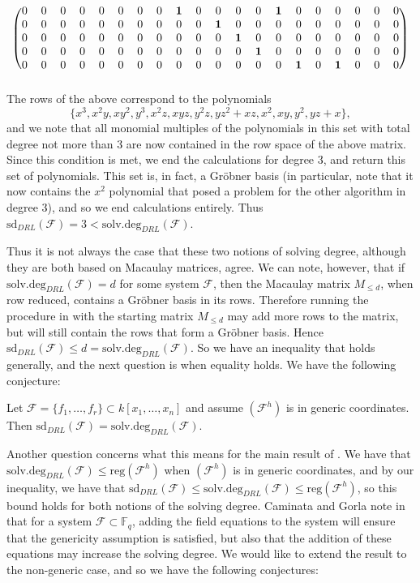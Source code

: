 \documentclass[11pt]{article}
\newenvironment{conjecture}[2][Conjecture]{\begin{trivlist}
\item[\hskip \labelsep {\bfseries #1}\hskip \labelsep {\bfseries #2.}]}{\end{trivlist}}
\newcommand{\F}{\mathcal{F}}
\newcommand{\sdeg}{\text{solv.deg}}
\newcommand{\sd}{\text{sd}}
\newcommand{\reg}{\text{reg}}
\begin{document}
\[\begin{blockarray}{cccccccccccccccccccc}
\begin{block}{(cccccccccccccccccccc)}
		0 & 0 & 0 & 0 & 0 & 0 & 0 & 0 & \mathbf{1} & 0 & 0 & 0 & 0 & \mathbf{1} & 0 & 0 & 0 & 0 & 0 & 0 \\
		0 & 0 & 0 & 0 & 0 & 0 & 0 & 0 & 0 & 0 & \mathbf{1} & 0 & 0 & 0 & 0 & 0 & 0 & 0 & 0 & 0 \\
		0 & 0 & 0 & 0 & 0 & 0 & 0 & 0 & 0 & 0 & 0 & \mathbf{1} & 0 & 0 & 0 & 0 & 0 & 0 & 0 & 0 \\
		0 & 0 & 0 & 0 & 0 & 0 & 0 & 0 & 0 & 0 & 0 & 0 & \mathbf{1} & 0 & 0 & 0 & 0 & 0 & 0 & 0 \\
		0 & 0 & 0 & 0 & 0 & 0 & 0 & 0 & 0 & 0 & 0 & 0 & 0 & 0 & \mathbf{1} & 0 & \mathbf{1} & 0 & 0 & 0 \\
	\end{block}
\end{blockarray} \] The rows of the above correspond to the polynomials \[ \{x^3, x^2y, xy^2, y^3, x^2z, xyz, y^2z, yz^2 + xz, x^2, xy, y^2, yz + x\}, \] and we note that all monomial multiples of the polynomials in this set with total degree not more than 3 are now contained in the row space of the above matrix. Since this condition is met, we end the calculations for degree 3, and return this set of polynomials. This set is, in fact, a Gröbner basis (in particular, note that it now contains the $x^2$ polynomial that posed a problem for the other algorithm in degree 3), and so we end calculations entirely. Thus $\sd_{DRL}(\F) = 3 < \sdeg_{DRL}(\F)$. 

Thus it is not always the case that these two notions of solving degree, although they are both based on Macaulay matrices, agree. We can note, however, that if $\sdeg_{DRL}(\F) = d$ for some system $\F$, then the Macaulay matrix $M_{\leq d}$, when row reduced, contains a Gröbner basis in its rows. Therefore running the procedure in \cite{caminata2023solving} with the starting matrix $M_{\leq d}$ may add more rows to the matrix, but will still contain the rows that form a Gröbner basis. Hence $\sd_{DRL}(\F) \leq d = \sdeg_{DRL}(\F)$. So we have an inequality that holds generally, and the next question is when equality holds. We have the following conjecture:

\begin{conjecture}{1}
	Let $\F = \{f_1, \dots, f_r\} \subset k[x_1, \dots, x_n]$ and assume $(\F^h)$ is in generic coordinates. Then $\sd_{DRL}(\F) = \sdeg_{DRL}(\F)$.
\end{conjecture}

Another question concerns what this means for the main result of \cite{caminata2020solving}. We have that $\sdeg_{DRL}(\F) \leq \reg(\F^h)$ when $(\F^h)$ is in generic coordinates, and by our inequality, we have that $\sd_{DRL}(\F) \leq \sdeg_{DRL}(\F) \leq \reg(\F^h)$, so this bound holds for both notions of the solving degree. Caminata and Gorla note in \cite{caminata2020solving} that for a system $\F \subset \mathbb{F}_q$, adding the field equations to the system will ensure that the genericity assumption is satisfied, but also that the addition of these equations may increase the solving degree. We would like to extend the result to the non-generic case, and so we have the following conjectures:
\end{document}
